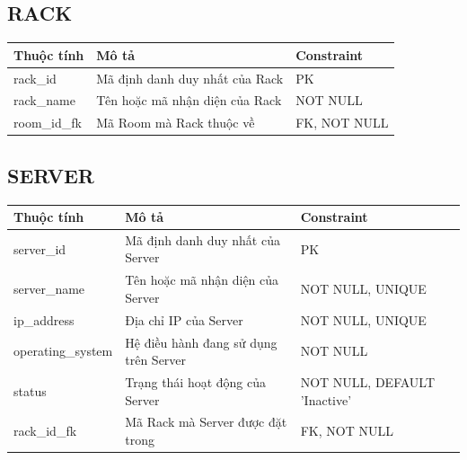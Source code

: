 \subsection{RACK}
\begin{center}
\begin{longtable}{|>{\raggedright\arraybackslash}p{3.5cm}|>{\raggedright\arraybackslash}p{6.5cm}|>{\raggedright\arraybackslash}p{4.5cm}|}
\hline
\textbf{Thuộc tính} & \textbf{Mô tả} & \textbf{Constraint} \\ \hline
\endhead
rack\_id & Mã định danh duy nhất của Rack & PK \\ \hline
rack\_name & Tên hoặc mã nhận diện của Rack & NOT NULL \\ \hline
room\_id\_fk & Mã Room mà Rack thuộc về & FK, NOT NULL \\ \hline
\end{longtable}
\end{center}

\subsection{SERVER}
\begin{center}
\begin{longtable}{|>{\raggedright\arraybackslash}p{3.5cm}|>{\raggedright\arraybackslash}p{6.5cm}|>{\raggedright\arraybackslash}p{4.5cm}|}
\hline
\textbf{Thuộc tính} & \textbf{Mô tả} & \textbf{Constraint} \\ \hline
\endhead
server\_id & Mã định danh duy nhất của Server & PK \\ \hline
server\_name & Tên hoặc mã nhận diện của Server & NOT NULL, UNIQUE \\ \hline
ip\_address & Địa chỉ IP của Server & NOT NULL, UNIQUE \\ \hline
operating\_system & Hệ điều hành đang sử dụng trên Server & NOT NULL \\ \hline
status & Trạng thái hoạt động của Server & NOT NULL, DEFAULT 'Inactive' \\ \hline
rack\_id\_fk & Mã Rack mà Server được đặt trong & FK, NOT NULL \\ \hline
\end{longtable}
\end{center}


